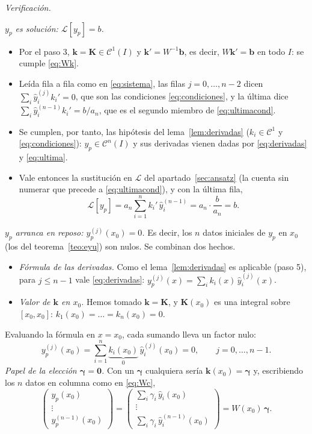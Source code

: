 \documentclass[11pt,twoside]{article}
\newcommand\Lop{\mathcal L}
\newcommand\yh{\hat y}
\newcommand\Cl{\mathcal C}
\newcommand\vk{\bm k}
\newcommand\vb{\bm b}
\newcommand\vK{\bm K}
\newcommand\vgamma{\bm\gamma}
\newcommand\mat[1]{\begin{pmatrix}#1\end{pmatrix}}
\begin{document}
\begin{demostracion}
\emph{Verificación.}
\begin{pasos}[resume]
\item \emph{$y_p$ es solución: $\Lop[y_p]=b$.}
\begin{itemize}
\item Por el paso 3, $\vk=\vK\in\Cl^1(I)$ y $\vk'=W^{-1}\vb$, es decir, $W\vk'=\vb$ en todo $I$: se cumple \eqref{eq:Wk}.
\item Leída fila a fila como en \eqref{eq:sistema}, las filas $j=0,\dots,n-2$ dicen $\sum_i\yh_i^{(j)}k_i'=0$, que son las
condiciones \eqref{eq:condiciones}, y la última dice $\sum_i\yh_i^{(n-1)}k_i'=b/a_n$, que es el segundo miembro de
\eqref{eq:ultimacond}.
\item Se cumplen, por tanto, las hipótesis del lema~\ref{lem:derivadas} ($k_i\in\Cl^1$ y \eqref{eq:condiciones}):
$y_p\in\Cl^n(I)$ y sus derivadas vienen dadas por \eqref{eq:derivadas} y \eqref{eq:ultima}.
\item Vale entonces la sustitución en $\Lop$ del apartado~\ref{sec:ansatz} (la cuenta sin numerar que precede a
\eqref{eq:ultimacond}), y con la última fila,
\begin{equation*}
\Lop[y_p]=a_n\sum_{i=1}^{n}k_i'\,\yh_i^{(n-1)}=a_n\cdot\frac{b}{a_n}=b.
\end{equation*}
\end{itemize}
\item \emph{$y_p$ arranca en reposo: $y_p^{(j)}(x_0)=0$.} Es decir, los $n$ datos iniciales de $y_p$ en $x_0$ (los del
teorema~\ref{teo:eyu}) son nulos. Se combinan dos hechos.
\begin{itemize}
\item \emph{Fórmula de las derivadas.} Como el lema~\ref{lem:derivadas} es aplicable (paso 5), para $j\le n-1$ vale
\eqref{eq:derivadas}: $y_p^{(j)}(x)=\sum_ik_i(x)\,\yh_i^{(j)}(x)$.
\item \emph{Valor de $\vk$ en $x_0$.} Hemos tomado $\vk=\vK$, y $\vK(x_0)$ es una integral sobre $[x_0,x_0]$:
$k_1(x_0)=\dots=k_n(x_0)=0$.
\end{itemize}
Evaluando la fórmula en $x=x_0$, cada sumando lleva un factor nulo:
\begin{equation*}
y_p^{(j)}(x_0)=\sum_{i=1}^{n}\underbrace{k_i(x_0)}_{0}\,\yh_i^{(j)}(x_0)=0,\qquad j=0,\dots,n-1.
\end{equation*}
\emph{Papel de la elección $\vgamma=\bm0$.} Con un $\vgamma$ cualquiera sería $\vk(x_0)=\vgamma$ y, escribiendo los $n$
datos en columna como en \eqref{eq:Wc},
\begin{equation*}
\mat{y_p(x_0)\\ \vdots\\ y_p^{(n-1)}(x_0)}=\mat{\sum_i\gamma_i\,\yh_i(x_0)\\ \vdots\\ \sum_i\gamma_i\,\yh_i^{(n-1)}(x_0)}=W(x_0)\,\vgamma.

\end{equation*}
\end{pasos}
\end{demostracion}
\end{document}
